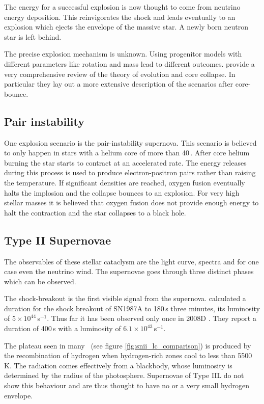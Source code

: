 The energy for a successful explosion is now thought to come from neutrino energy deposition. This reinvigorates the shock and leads eventually to an explosion which ejects the envelope of the massive star. A newly born neutron star is left behind.

The precise explosion mechanism is unknown. Using progenitor models with different parameters like rotation and mass lead to different outcomes. \citet{2002RvMP...74.1015W}provide a very comprehensive review of the theory of evolution and core collapse. In particular they lay out a more extensive description of the scenarios after core-bounce.

\subsection{Pair instability}
One explosion scenario is the pair-instability supernova. This scenario is believed to only happen in stars with a helium core of more than 40\,\msun. After core helium burning the star starts to contract at an accelerated rate. The energy releases during this process is used to produce electron-positron pairs rather than raising the temperature. If significant densities are reached, oxygen fusion eventually halts the implosion and the collapse bounces to an explosion. For very high stellar masses it is believed that oxygen fusion does not provide enough energy to halt the contraction and the star collapses to a black hole.


\subsection{Type II Supernovae}
The observables of these stellar cataclysm are the light curve, spectra and for one case even the neutrino wind. The supernovae goes through three distinct phases which can be observed. 

The shock-breakout is the first visible signal from the supernova.  \cite{1992ApJ...393..742E} calculated a duration for the  shock breakout of SN1987A to 180\,s three minutes, its  luminosity of $5\times10^{44}$\erg\,s$^{-1}$. 
Thus far it has been observed only once in 2008D \citep{2008Natur.453..469S}. They report a duration of 400\,s with a luminosity of $6.1\times10^{43}$\erg\,s$^{-1}$.

The plateau seen in many \snii\ (see figure \ref{fig:snii_lc_comparison}) is produced by the recombination of hydrogen when hydrogen-rich zones cool to less than 5500\,K. The radiation comes effectively from a blackbody, whose luminosity is determined  by the radius of the photosphere.
Supernovae of Type IIL do not show this behaviour and are thus thought to have no or a very small hydrogen envelope.

